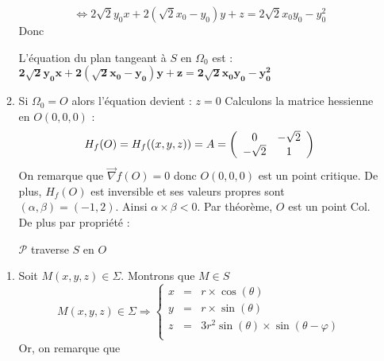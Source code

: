 \begin{enumerate}
\begin{enumerate}
                \[
                  \iff
                  2\sqrt{2}y_0x + 2(\sqrt{2}x_0-y_0)y + z = 2\sqrt{2}x_0y_0 - y_0^{2}
                \]
                Donc
                \begin{result}
                  L'équation du plan tangeant à $S$ en $\Omega_0$ est :
                  $\boldsymbol{2\sqrt{2}y_0x + 2(\sqrt{2}x_0-y_0)y + z = 2\sqrt{2}x_0y_0 - y_0^{2}}$
                \end{result}
          \item Si $\Omega_0 = O$ alors l'équation devient :
                $z = 0$
                Calculons la matrice hessienne en $O(0,0,0)$ :
                \[
                  H_f(O) = H_f((x, y, z)) = A =
                  \left(
                  \begin{array}{c c}
                      0         & -\sqrt{2} \\
                      -\sqrt{2} & 1         \\
                    \end{array}
                  \right)
                \]
                On remarque que $\overrightarrow{\nabla}f(O) = 0$ donc $O(0,0,0)$ est un point critique. De plus,
                $H_f(O)$ est inversible et ses valeurs propres sont $(\alpha, \beta) = (-1,2)$. Ainsi $\alpha\times\beta<0$. Par théorème, $O$ est un point Col. De plus par propriété :
                \begin{result}
                  $\mathcal{P}$ traverse $S$ en $O$
                \end{result}
        \end{enumerate}
        \begin{enumerate}
          \item
                Soit $M(x, y, z) \in \Sigma$. Montrons que $M\in S$
                \[
                  M(x, y, z) \in \Sigma \Rightarrow
                  \left\{
                  \begin{array}{rcl}
                    x & = & r \times \cos{(\theta)}                            \\
                    y & = & r \times \sin{(\theta)}                            \\
                    z & = & 3 r^{2} \sin{(\theta)}\times\sin{(\theta-\varphi)} \\
                  \end{array}
                  \right.
                \] Or, on remarque que
                \[
                  \begin{array}{rcl}

\end{array}\]
\end{enumerate}
\end{enumerate}
